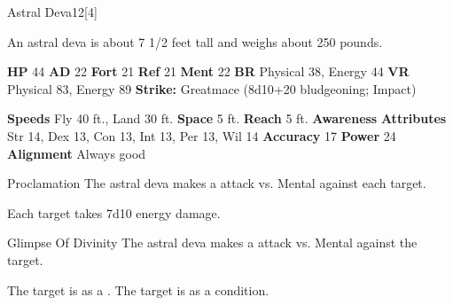       
  \begin{monsubsection}{Astral Deva}{12}[4]
    \vspace{-1em}\vspace{-1em}
    \vspace{0em}

    
          An astral deva is about 7 1/2 feet tall and weighs about 250 pounds.
        

    \begin{spellcontent}
      \begin{spelltargetinginfo}
        \pari \textbf{HP} 44 \monsep
          \textbf{AD} 22 \monsep
          \textbf{Fort} 21 \monsep
          \textbf{Ref} 21 \monsep
          \textbf{Ment} 22
        \pari \textbf{BR} Physical 38, Energy 44 \monsep
        \textbf{VR} Physical 83, Energy 89
        \pari \textbf{Strike:}
            Greatmace  (8d10+20 bludgeoning; Impact)
      \end{spelltargetinginfo}
    \end{spellcontent}
    \begin{monsterfooter}
      \pari \textbf{Speeds} Fly 40 ft., Land 30 ft. \monsep
        \textbf{Space} 5 ft. \monsep
        \textbf{Reach} 5 ft.
      \pari \textbf{Awareness} 
      \pari \textbf{Attributes}
        Str 14, Dex 13,
        Con 13, Int 13,
        Per 13, Wil 14
      \pari \textbf{Accuracy} 17 \monsep
        \textbf{Power} 24
      \pari \textbf{Alignment} Always good
    \end{monsterfooter}
  \end{monsubsection}
  \begin{freeability}{Proclamation}
       The astral deva makes a  attack
        vs. Mental against each target.
    
    \hit Each target takes 7d10 energy damage.
    \end{freeability}
  

    \begin{freeability}{Glimpse Of Divinity}
       The astral deva makes a  attack
        vs. Mental against the target.
    
    \hit The target is  as a .
    \crit The target is  as a condition.
    \end{freeability}
  

